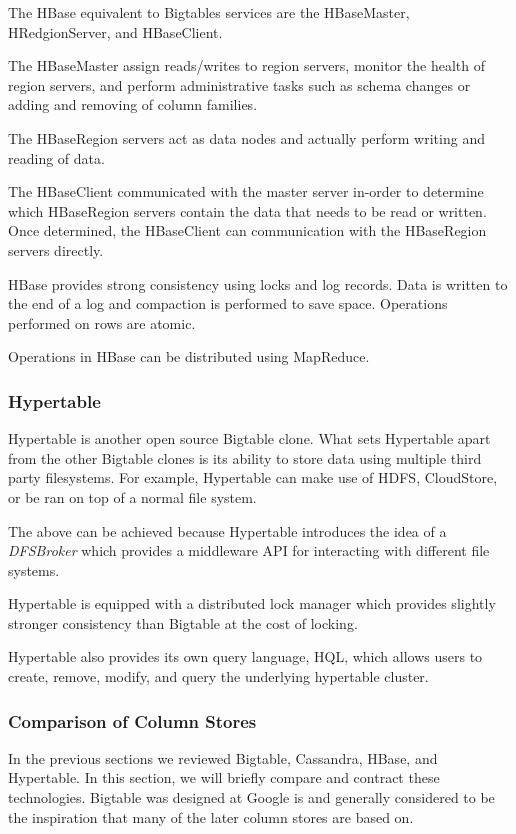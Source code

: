 \documentclass[]{article}
\begin{document}
The HBase equivalent to Bigtables services are the HBaseMaster, HRedgionServer, and HBaseClient.

The HBaseMaster assign reads/writes to region servers, monitor the health of region servers, and perform administrative tasks such as schema changes or adding and removing of column families.

The HBaseRegion servers act as data nodes and actually perform writing and reading of data.

The HBaseClient communicated with the master server in-order to determine which HBaseRegion servers contain the data that needs to be read or written. Once determined, the HBaseClient can communication with the HBaseRegion servers directly.

HBase provides strong consistency using locks and log records. Data is written to the end of a log and compaction is performed to save space\cite{cattell_scalable_2011}. Operations performed on rows are atomic.

Operations in HBase can be distributed using MapReduce.

\subsubsection{Hypertable}\label{sssec:hypertable}
Hypertable is another open source Bigtable clone\cite{khetrapal_hbase_2006}. What sets Hypertable apart from the other Bigtable clones is its ability to store data using multiple third party filesystems. For example, Hypertable can make use of HDFS, CloudStore, or be ran on top of a normal file system.

The above can be achieved because Hypertable introduces the idea of a \textit{DFSBroker} which provides a middleware API for interacting with different file systems.

Hypertable is equipped with a distributed lock manager which provides slightly stronger consistency than Bigtable at the cost of locking\cite{chen_big_2014}.

Hypertable also provides its own query language, HQL, which allows users to create, remove, modify, and query the underlying hypertable cluster.

\subsubsection{Comparison of Column Stores}
In the previous sections we reviewed Bigtable, Cassandra, HBase, and Hypertable. In this section, we will briefly compare and contract these technologies. Bigtable was designed at Google is and generally considered to be the inspiration that many of the later column stores are based on.
\end{document}
